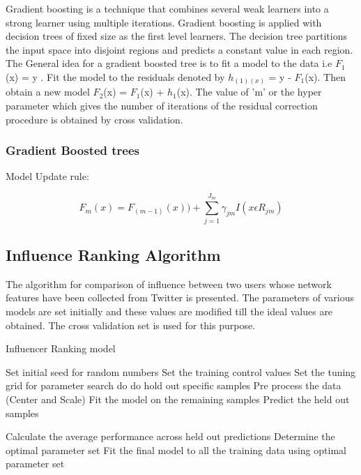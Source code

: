 Gradient boosting is a technique that combines several weak learners into a strong learner using multiple iterations. Gradient boosting is applied with decision trees of fixed size as the first level learners. The decision tree partitions the input space into disjoint regions and predicts a constant value in each region. The General idea for a gradient boosted tree is to fit a model to the data i.e $F_1$(x) = y . Fit the model to the residuals denoted by $h_{(1)(x)}$ = y - $F_1$(x). Then obtain a new model $F_2$(x) = $F_1$(x) + $h_1$(x). The value of 'm' or the hyper parameter which gives the number of iterations of the residual correction procedure is obtained by cross validation. \\ 





\subsubsection{Gradient Boosted trees}



Model Update rule:

\begin{equation}
F_{m}(x) = F_{(m-1)}(x)) + \sum_{j=1}^{J_m} \gamma_{jm} I (x \epsilon R_{jm}) 
\end{equation}

\subsection{Influence Ranking Algorithm}

The algorithm for comparison of influence between two users whose network features have been collected from Twitter is presented. The parameters of various models are set initially and these values are modified till the ideal values are obtained. The cross validation set is used for this purpose.\\

\begin{algorithm}
\caption{Influencer Ranking model}
\begin{algorithmic}[1]
 \State Set initial seed for random numbers
 \State Set the training control values
 \State Set the tuning grid for parameter search
  do
  do
 \State hold out specific samples
 \State Pre process the data (Center and Scale)
 \State Fit the model on the remaining samples
 \State Predict the held out samples
 
 \EndFor
 \State Calculate the average performance across held out predictions
 \EndFor
 \State Determine the optimal parameter set
 \State Fit the final model to all the training data using optimal parameter set 
 

\end{algorithmic}
\end{algorithm}

